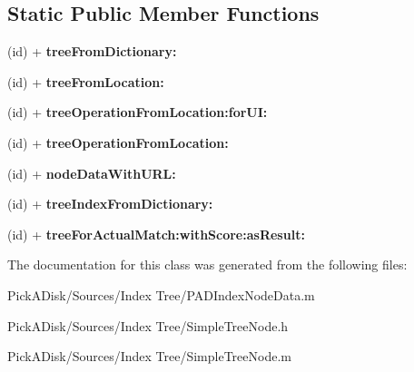 \subsection*{Static Public Member Functions}
\begin{DoxyCompactItemize}
\item 
\hypertarget{class_simple_tree_node_a1938cb504070ad4075b389a820a9283f}{
(id) + {\bfseries treeFromDictionary:}}
\label{class_simple_tree_node_a1938cb504070ad4075b389a820a9283f}

\item 
\hypertarget{class_simple_tree_node_a2383be70f5708a3999b29b53a4f506d8}{
(id) + {\bfseries treeFromLocation:}}
\label{class_simple_tree_node_a2383be70f5708a3999b29b53a4f506d8}

\item 
\hypertarget{class_simple_tree_node_ad2091995385bd327b927bd1a13a7ed54}{
(id) + {\bfseries treeOperationFromLocation:forUI:}}
\label{class_simple_tree_node_ad2091995385bd327b927bd1a13a7ed54}

\item 
\hypertarget{class_simple_tree_node_a94579e292f4ed8a3c9dc5a26a9b1327f}{
(id) + {\bfseries treeOperationFromLocation:}}
\label{class_simple_tree_node_a94579e292f4ed8a3c9dc5a26a9b1327f}

\item 
\hypertarget{class_simple_tree_node_abcf7dfe27fa1d02332745d83112a35a5}{
(id) + {\bfseries nodeDataWithURL:}}
\label{class_simple_tree_node_abcf7dfe27fa1d02332745d83112a35a5}

\item 
\hypertarget{class_simple_tree_node_ade7eb40230ec5d64828c35588867e165}{
(id) + {\bfseries treeIndexFromDictionary:}}
\label{class_simple_tree_node_ade7eb40230ec5d64828c35588867e165}

\item 
\hypertarget{class_simple_tree_node_a5c5509440a341bdae524b7909786e9e2}{
(id) + {\bfseries treeForActualMatch:withScore:asResult:}}
\label{class_simple_tree_node_a5c5509440a341bdae524b7909786e9e2}

\end{DoxyCompactItemize}


The documentation for this class was generated from the following files:\begin{DoxyCompactItemize}
\item 
PickADisk/Sources/Index Tree/PADIndexNodeData.m\item 
PickADisk/Sources/Index Tree/SimpleTreeNode.h\item 
PickADisk/Sources/Index Tree/SimpleTreeNode.m\end{DoxyCompactItemize}
